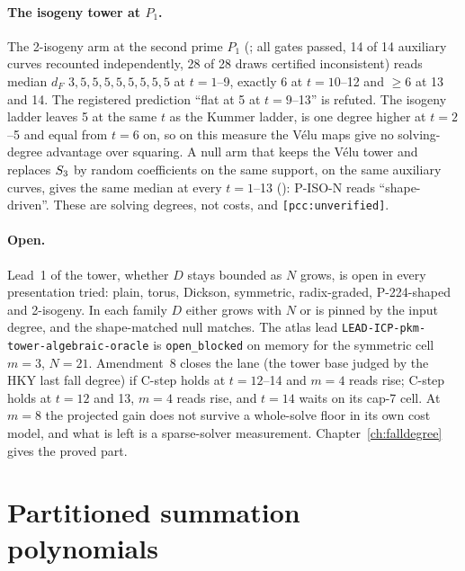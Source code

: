 \paragraph{The isogeny tower at $P_1$.} The 2-isogeny arm at the second
prime $P_1$ (;
all gates passed, 14 of 14 auxiliary curves recounted independently, 28 of
28 draws certified inconsistent) reads median $d_F$ $3,5,5,5,5,5,5,5,5$ at
$t=1$--9, exactly 6 at $t=10$--12 and $\ge6$ at 13 and 14. The registered
prediction ``flat at 5 at $t=9$--13'' is refuted. The isogeny ladder leaves 5
at the same $t$ as the Kummer ladder, is one degree higher at $t=2$--5 and
equal from $t=6$ on, so on this measure the V\'elu maps give no solving-degree
advantage over squaring. A null arm that keeps the V\'elu tower and replaces
$S_{3}$ by random coefficients on the same support, on the same auxiliary
curves, gives the same median at every $t=1$--13
():
P-ISO-N reads ``shape-driven''. These are solving degrees, not costs, and
\texttt{[pcc:unverified]}.

\paragraph{Open.} Lead~1 of the tower, whether $D$ stays bounded as $N$
grows, is open in every presentation tried: plain, torus, Dickson,
symmetric, radix-graded, P-224-shaped and 2-isogeny. In each family $D$
either grows with $N$ or is pinned by the input degree, and the
shape-matched null matches. The atlas lead
\texttt{LEAD-ICP-pkm-tower-algebraic-oracle} is \texttt{open\_blocked} on
memory for the symmetric cell $m=3$, $N=21$. Amendment~8 closes the lane
(the tower base judged by the HKY last fall degree) if C-step holds at
$t=12$--14 and $m=4$ reads rise; C-step holds at $t=12$ and 13, $m=4$ reads
rise, and $t=14$ waits on its cap-7 cell. At $m=8$ the projected gain does
not survive a whole-solve floor in its own cost model, and what is left is
a sparse-solver measurement. Chapter~\ref{ch:falldegree} gives the proved
part.

\section{Partitioned summation polynomials}\label{sec:pa-aps}

